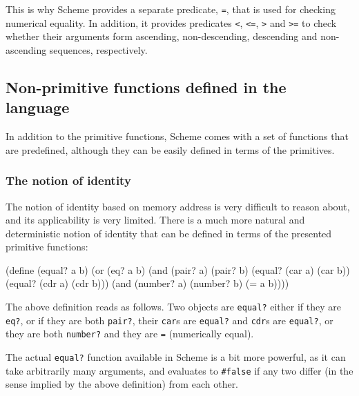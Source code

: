 This is why Scheme provides a separate predicate, \texttt{=},
that is used for checking numerical equality. In addition, it
provides predicates \texttt{<}, \texttt{<=}, \texttt{>} and
\texttt{>=} to check whether their arguments form ascending,
non-descending, descending and non-ascending sequences, respectively.

\subsection{Non-primitive functions defined in the language}

In addition to the primitive functions, Scheme comes with a set
of functions that are predefined, although they can be easily
defined in terms of the primitives.

\subsubsection{The notion of identity}

The notion of identity based on memory address is very difficult
to reason about, and its applicability is very limited. There
is a much more natural and deterministic notion of identity that
can be defined in terms of the presented primitive functions:

\begin{Snippet}
(define (equal? a b)
  (or (eq? a b)
      (and (pair? a)
           (pair? b)
           (equal? (car a) (car b))
           (equal? (cdr a) (cdr b)))
      (and (number? a)
           (number? b)
           (= a b))))
\end{Snippet}

The above definition reads as follows. Two objects are \texttt{equal?}
either if they are \texttt{eq?}, or if they are both \texttt{pair?},
their \texttt{car}s are \texttt{equal?} and \texttt{cdr}s are \texttt{equal?},
or they are both \texttt{number?} and they are \texttt{=}
(numerically equal).

The actual \texttt{equal?} function available in Scheme is a bit more
powerful, as it can take arbitrarily many arguments, and evaluates to
\texttt{\#false} if any two differ (in the sense implied by the above
definition) from each other.



